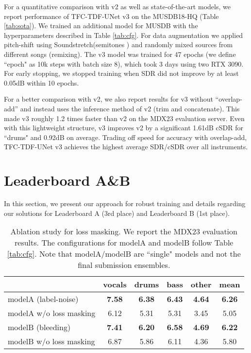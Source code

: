 \documentclass[10pt]{article}
\begin{document}
For a quantitative comparison with v2 as well as state-of-the-art models, we report performance of TFC-TDF-UNet v3 on the MUSDB18-HQ\cite{musdbhq} (Table \ref{tab:sota}). 
We trained an additional model for MUSDB with the hyperparameters described in Table \ref{tab:cfg}. 
For data augmentation we applied pitch-shift using Soundstretch\footnotemark[3] (semitones ) and randomly mixed sources from different songs (remixing)\cite{blend}. 
The v3 model was trained for 47 epochs (we define ``epoch" as 10k steps with batch size 8), which took 3 days using two RTX 3090. 
For early stopping, we stopped training when SDR did not improve by at least 0.05dB within 10 epochs.  


For a better comparison with v2, we also report results for v3 without ``overlap-add'' and instead uses the inference method of v2 (trim and concatenate). This made v3 roughly 1.2 times faster than v2 on the MDX23 evaluation server. Even with this lightweight structure, v3 improves v2 by a significant 1.61dB cSDR for ``drums" and 0.92dB on average. Trading off speed for accuracy with overlap-add, TFC-TDF-UNet v3 achieves the highest average SDR/cSDR over all instruments.









\section{Leaderboard A\&B}
\label{sec:ab}
In this section, we present our approach for robust training and details regarding our solutions for Leaderboard A (3rd place) and Leaderboard B (1st place).


\begingroup
\setlength{\tabcolsep}{2.5pt}
\renewcommand{\arraystretch}{1.1}
\begin{table}
\centering
\begin{tabular}{l|ccccc}
\noalign{\smallskip}\noalign{\smallskip}\hline\hline
\multicolumn{1}{c|}{Model} & vocals & drums & bass & other & mean \\
\hline
modelA (label-noise) & \textbf{7.58} & \textbf{6.38} & \textbf{6.43} & \textbf{4.64} & \textbf{6.26} \\
modelA w/o loss masking & 6.12 & 5.31 & 5.31 & 3.45 & 5.05 \\
\hline
modelB (bleeding) & \textbf{7.41} & \textbf{6.20} & \textbf{6.58} & \textbf{4.69} & \textbf{6.22} \\
modelB w/o loss masking & 6.87 & 5.86 & 6.11 & 4.36 & 5.80 \\
\hline
\hline
\end{tabular}
\caption{
Ablation study for loss masking. We report the MDX23 evaluation results. 
The configurations for modelA and modelB follow Table \ref{tab:cfg}.
Note that modelA/modelB are ``single" models and not the final submission ensembles.
}
\label{tab:AB}
\end{table}
\endgroup
\end{document}
